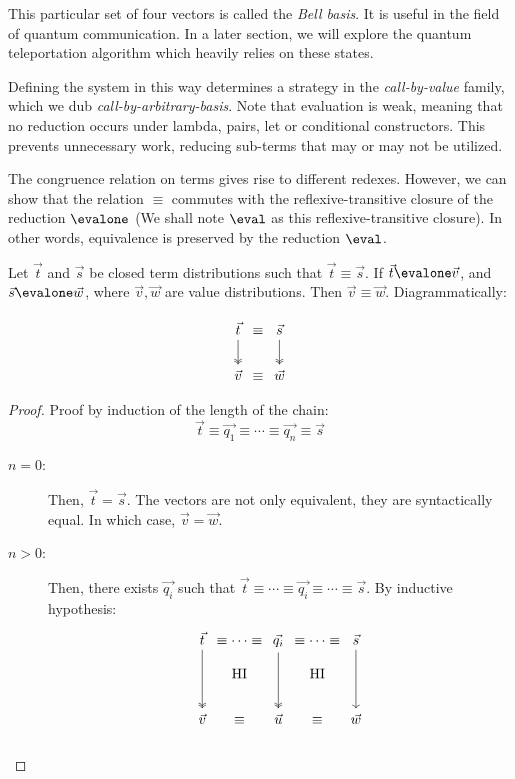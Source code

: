 This particular set of four vectors is called the \textit{Bell basis}. It is useful in the field of quantum communication. In a later section, we will explore the quantum teleportation algorithm which heavily relies on these states. 

Defining the system in this way determines a strategy in the \textit{call-by-value} family, which we dub \textit{call-by-arbitrary-basis}. Note that evaluation is weak, meaning that no reduction occurs under lambda, pairs, let or conditional constructors. This prevents unnecessary work, reducing sub-terms that may or may not be utilized.

The congruence relation on terms gives rise to different redexes. However, we can show that the relation $\equiv$ commutes with the reflexive-transitive closure of the reduction $\evalone$ (We shall note $\eval$ as this reflexive-transitive closure). In other words, equivalence is preserved by the reduction $\eval$.

\begin{theorem}
  Let $\vec{t}$ and $\vec{s}$ be closed term distributions such that $\vec{t}\equiv\vec{s}$. If $\vec{t}\evalone\vec{v}$, and $\vec{s}\evalone\vec{w}$, where $\vec{v},\vec{w}$ are value distributions. Then $\vec{v}\equiv\vec{w}$. Diagrammatically:

\[
  \begin{tikzcd}
   \vec{t} \arrow[d,twoheadrightarrow]&[-2.5em] \equiv &[-2.5em] \vec{s}\arrow[d,twoheadrightarrow]\\
   \vec{v}& \equiv & \vec{w}
  \end{tikzcd}
\]
\end{theorem}

\begin{proof}
  Proof by induction of the length of the chain:
  \[
  \vec{t}\equiv\vec{q_1}\equiv\dotsb\equiv\vec{q_n}\equiv\vec{s}
  \]
  
  \begin{description}
    \item[$n=0$:] Then, $\vec{t} = \vec{s}$. The vectors are not only equivalent, they are syntactically equal. In which case, $\vec{v}=\vec{w}$.

    \item[$n>0$:] Then, there exists $\vec{q_i}$ such that $\vec{t}\equiv\dotsb\equiv\vec{q_i}\equiv\dotsb\equiv\vec{s}$. By inductive hypothesis:
    \[
    \begin{tikzcd}
      \vec{t}\arrow[dd, twoheadrightarrow] &[-2.5em]\equiv\dotsb\equiv &[-2.5em]\vec{q_i}\arrow[dd, twoheadrightarrow]&[-2.5em] \equiv\dotsb\equiv &[-2.5em] \vec{s}\arrow[dd]\\[-1em]
      & \text{HI} & & \text{HI} &\\
      \vec{v} &\equiv& \vec{u} &\equiv& \vec{w}\\[-1em]
    \end{tikzcd}
    \]\qedhere
    \end{description}
\end{proof}

